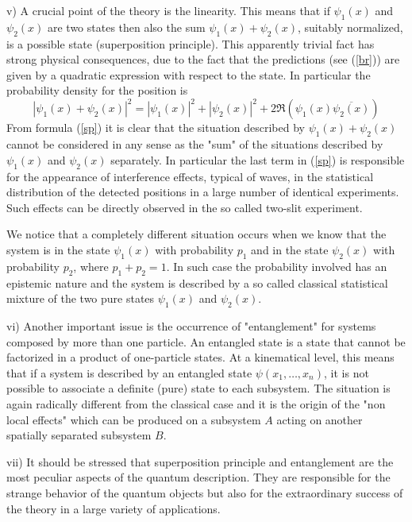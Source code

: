 \documentclass[12pt,reqno]{amsart}
\newcommand{\n}{\relax}
\newcommand{\be}{\begin{equation}}
\newcommand{\ee}{\end{equation}}
\numberwithin{equation}{section}
\begin{document}
v)  A crucial point of the theory is the linearity. This means that if $\psi_1 (x)$ and $\psi_2(x)$ are two  states then also the  sum $\psi_1(x)+\psi_2(x)$, suitably normalized, is a possible state (superposition principle). This apparently trivial fact has strong physical consequences, due to the fact that the predictions (see (\ref{br})) are given  by a quadratic expression with respect to the state. 
In particular the probability density for the position is 
\be\label{sp}
|\psi_1(x)+\psi_2(x)|^2 = |\psi_1(x)|^2 + |\psi_2 (x)|^2 + 2 \Re  \left(\psi_1 (x) \overline{\psi_2 (x)} \right)
\ee
From formula (\ref{sp}) it is clear that the situation described by $\psi_1(x)+\psi_2(x)$ cannot be considered in any sense as the "sum" of the situations described by $\psi_1 (x)$ and $\psi_2(x)$ separately. In particular the last term in (\ref{sp}) is responsible for the appearance of interference effects, typical of waves, in the statistical distribution of the detected positions in a large number of identical experiments. Such effects can be directly observed in the so called two-slit experiment. 

\n
We notice  that a completely different situation occurs when we know that the system is in the state $\psi_1(x)$ with probability $p_1$ and in the state $\psi_2(x)$ with probability $p_2$, where $p_1 + p_2=1$. In such case the probability involved has an epistemic nature and the system is described by a so called classical statistical mixture of the two pure states $\psi_1(x)$ and $\psi_2(x)$.


vi)  Another important issue  is the occurrence of "entanglement" for systems composed by more than one particle.  An entangled state is a state that cannot be factorized in a product of one-particle states. 
At a kinematical level, this means that if  a system is  described by an entangled state $\psi(x_1,\ldots,x_n)$, it is not possible to associate a definite (pure) state to each subsystem. The situation is again radically different from the classical case and it is the origin of the "non local effects" which can be produced on a subsystem $A$ acting on another spatially separated subsystem $B$.


vii)  It should be stressed that superposition principle and entanglement are the most peculiar aspects of the quantum description. They are responsible for the strange behavior of the quantum objects but also for the extraordinary success of the theory in a large variety of applications. 
\end{document}
